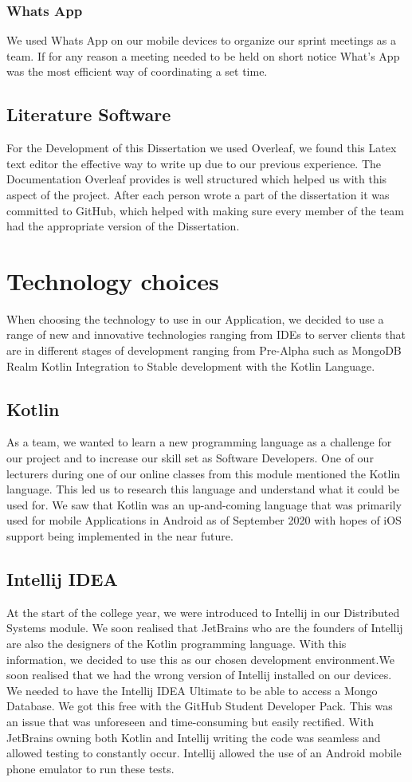 \subsubsection{Whats App}
We used Whats App on our mobile devices to organize our sprint meetings as a team. If for any reason a meeting needed to be held on short notice What's App was the most efficient way of coordinating a set time.
\subsection{Literature Software}
For the Development of this Dissertation we used Overleaf, we found this Latex text editor the effective way to write up due to our previous experience. The Documentation Overleaf provides is well structured which helped us with this aspect of the project. After each person wrote a part of the dissertation it was committed to GitHub, which helped with making sure every member of the team had the appropriate version of the Dissertation.

\section{Technology choices}
When choosing the technology to use in our Application, we decided to use a range of new and innovative technologies ranging from IDEs to server clients that are in different stages of development ranging from Pre-Alpha such as MongoDB Realm Kotlin Integration to Stable development with the Kotlin Language.
\subsection{Kotlin}
As a team, we wanted to learn a new programming language as a challenge for our project and to increase our skill set as Software Developers. One of our lecturers during one of our online classes from this module mentioned the Kotlin language. This led us to research this language and understand what it could be used for. We saw that Kotlin was an up-and-coming language that was primarily used for mobile Applications in Android as of September 2020 with hopes of iOS support being implemented in the near future.
\subsection{Intellij IDEA}
At the start of the college year, we were introduced to Intellij in our Distributed Systems module. We soon realised that JetBrains who are the founders of Intellij are also the designers of the Kotlin programming language. With this information, we decided to use this as our chosen development environment.We soon realised that we had the wrong version of Intellij installed on our devices. We needed to have the Intellij IDEA Ultimate to be able to access a Mongo Database. We got this free with the GitHub Student Developer Pack. This was an issue that was unforeseen and time-consuming but easily rectified. With JetBrains owning both Kotlin and Intellij writing the code was seamless and allowed testing to constantly occur. Intellij allowed the use of an Android mobile phone emulator to run these tests.
